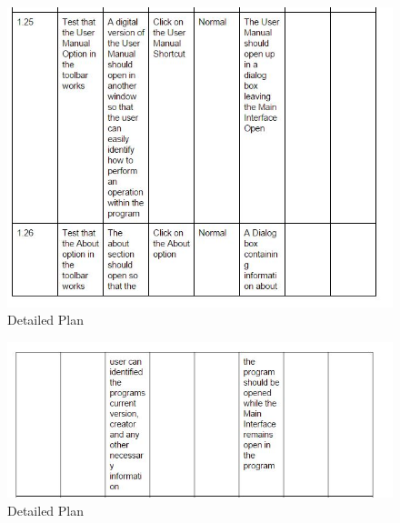 \begin{itemize}
\begin{figure}[H]
    \includegraphics[width=\textwidth]{DP16.JPG}
    \caption{Detailed Plan} \label{fig:VDetailed Plan}
\end{figure}

\begin{figure}[H]
    \includegraphics[width=\textwidth]{DP17.JPG}
    \caption{Detailed Plan} \label{fig:VDetailed Plan}
\end{figure}


\end{itemize}

